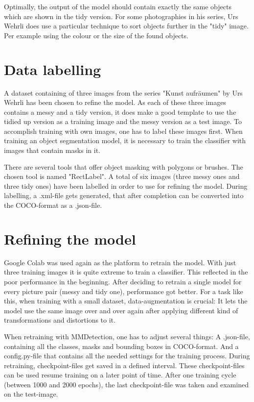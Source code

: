 Optimally, the output of the model should contain exactly the same objects which are shown in the tidy version. For some photographies in his series, Urs Wehrli does use a particular technique to sort objects further in the "tidy" image. Per example using the colour or the size of the found objects.

\section{Data labelling}

A dataset containing of three images from the series "Kunst aufräumen" by Urs Wehrli has been chosen to refine the model. As each of these three images contains a messy and a tidy version, it does make a good template to use the tidied up version as a training image and the messy version as a test image. To accomplish training with own images, one has to label these images first. When training an object segmentation model, it is necessary to train the classifier with images that contain masks in it.

There are several tools that offer object masking with polygons or brushes. The chosen tool is named "RectLabel". A total of six images (three messy ones and three tidy ones) have been labelled in order to use for refining the model. During labelling, a .xml-file gets generated, that after completion can be converted into the COCO-format as a .json-file.

\section{Refining the model}

Google Colab was used again as the platform to retrain the model. With just three training images it is quite extreme to train a classifier. This reflected in the poor performance in the beginning. After deciding to retrain a single model for every picture pair (messy and tidy one), performance got better. For a task like this, when training with a small dataset, data-augmentation is crucial: It lets the model use the same image over and over again after applying different kind of transformations and distortions to it.

When retraining with MMDetection, one has to adjust several things: A .json-file, containing all the classes, masks and bounding boxes in COCO-format. And a config.py-file that contains all the needed settings for the training process. During retraining, checkpoint-files get saved in a defined interval. These checkpoint-files can be used resume training on a later point of time. After one training cycle (between 1000 and 2000 epochs), the last checkpoint-file was taken and examined on the test-image.